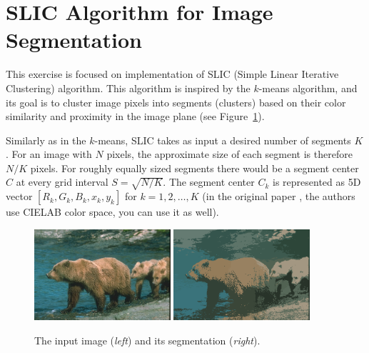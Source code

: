 \documentclass[12pt]{article}
\begin{document}
\section*{SLIC Algorithm for Image Segmentation}

This exercise is focused on implementation of SLIC (Simple Linear Iterative Clustering) algorithm.
This algorithm is inspired by the $k$-means algorithm, and its goal is to cluster image pixels into segments (clusters) based on their color similarity and proximity in the image plane (see Figure~\ref{img1}).

Similarly as in the $k$-means, SLIC takes as input a desired number of segments $K$.
For an image with $N$ pixels, the approximate size of each segment is therefore $N/K$ pixels. 
For roughly equally sized segments there would be a segment center $C$ at every grid interval $S = \sqrt{N/K}$.
The segment center $C_k$ is represented as 5D vector $[R_k, G_k, B_k, x_k, y_k]$ for $k=1, 2, \ldots, K$ (in the original paper \cite{slic}, the authors use CIELAB color space, you can use it as well).

\begin{figure}[h]
\centering
\includegraphics[width=0.45\textwidth]{images/100075}
\includegraphics[width=0.45\textwidth]{images/img_res}
\caption{The input image (\textit{left}) and its segmentation (\textit{right}).}
\label{img1}
\end{figure}
\end{document}
